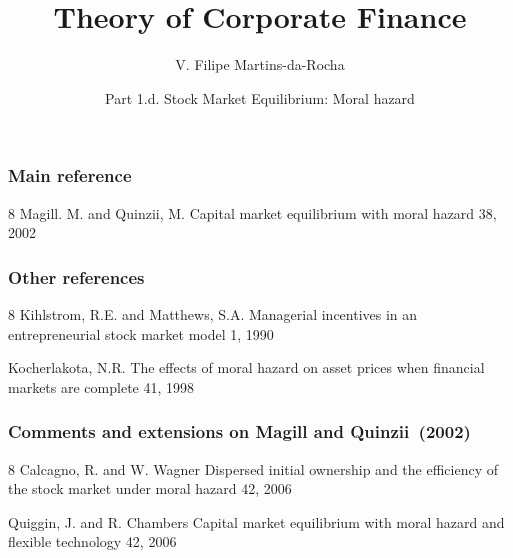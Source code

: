 \documentclass[blue]{beamer}
\title[Corporate Finance]{Theory of Corporate Finance}
\author[Victor Filipe]{V. Filipe Martins-da-Rocha}
\institute[FGV EESP]{Escola de Economia de S\~ao Paulo}
\date[April--June, 2026]{Part 1.d. Stock Market Equilibrium: Moral hazard}
\theoremstyle{definition}
\theoremstyle{example}
\begin{document}
\frame{\titlepage}


\begin{frame}\frametitle{Main reference}

\begin{thebibliography}{8}
\beamertemplatearticlebibitems
    Magill. M. and Quinzii, M.
    \newblock Capital market equilibrium with moral hazard
     38, 2002
\end{thebibliography}

\end{frame}


\begin{frame}\frametitle{Other references}

\begin{thebibliography}{8}
\beamertemplatearticlebibitems
    Kihlstrom, R.E. and Matthews, S.A.
    \newblock Managerial incentives in an entrepreneurial stock market model
     1, 1990

    Kocherlakota, N.R.
    \newblock The effects of moral hazard on asset prices when financial markets are complete
     41, 1998

\end{thebibliography}

\end{frame}




\begin{frame}\frametitle{Comments and extensions on Magill and Quinzii~(2002)}

\begin{thebibliography}{8}
  \beamertemplatearticlebibitems
    Calcagno, R. and W. Wagner
    \newblock Dispersed initial ownership and the efficiency of the stock market under moral hazard
     42, 2006

    Quiggin, J. and R. Chambers
    \newblock Capital market equilibrium with moral hazard and flexible technology
     42, 2006
\end{thebibliography}

\end{frame}
\end{document}
